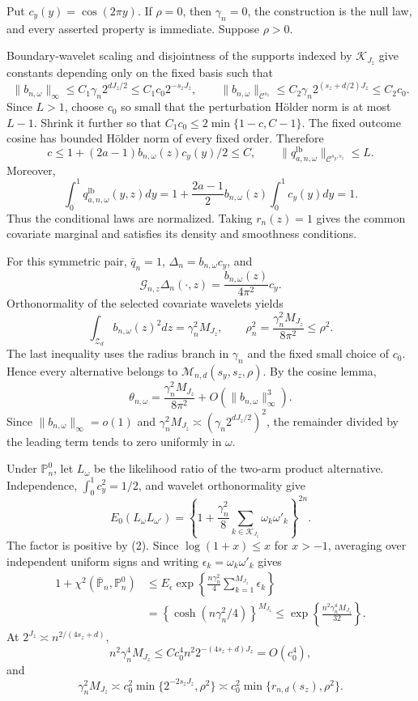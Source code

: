 Put \(c_y(y)=\cos(2\pi y)\). If \(\rho=0\), then \(\gamma_n=0\), the construction is the null law, and every asserted property is immediate. Suppose \(\rho>0\).

Boundary-wavelet scaling and disjointness of the supports indexed by \(\mathcal K_{J_z}\) give constants depending only on the fixed basis such that
\[
\|b_{n,\omega}\|_\infty
\le C_1\gamma_n2^{dJ_z/2}
\le C_1c_0 2^{-s_zJ_z},
\qquad
\|b_{n,\omega}\|_{\mathcal C^{s_z}}
\le C_2\gamma_n2^{(s_z+d/2)J_z}
\le C_2c_0.                                           \tag{1}
\]
Since \(L>1\), choose \(c_0\) so small that the perturbation H\"older norm is at most \(L-1\). Shrink it further so that \(C_1c_0\le2\min\{1-c,C-1\}\). The fixed outcome cosine has bounded H\"older norm of every fixed order. Therefore
\[
c\le 1+(2a-1)b_{n,\omega}(z)c_y(y)/2\le C,
\qquad
\|q_{a,n,\omega}^{\mathrm{lb}}\|_{\mathcal C^{s_y,s_z}}\le L. \tag{2}
\]
Moreover,
\[
\int_0^1q_{a,n,\omega}^{\mathrm{lb}}(y,z)dy
=1+\frac{2a-1}{2}b_{n,\omega}(z)\int_0^1c_y(y)dy=1.   \tag{3}
\]
Thus the conditional laws are normalized. Taking \(r_n(z)=1\) gives the common covariate marginal and satisfies its density and smoothness conditions.

For this symmetric pair, \(\bar q_n=1\), \(\Delta_n=b_{n,\omega}c_y\), and
\[
\mathcal G_{n,z}\Delta_n(\cdot,z)
=\frac{b_{n,\omega}(z)}{4\pi^2}c_y.
\]
Orthonormality of the selected covariate wavelets yields
\[
\int_{\mathcal Z_d}b_{n,\omega}(z)^2dz
=\gamma_n^2M_{J_z},\qquad
\rho_n^2=\frac{\gamma_n^2M_{J_z}}{8\pi^2}\le\rho^2.   \tag{4}
\]
The last inequality uses the radius branch in \(\gamma_n\) and the fixed small choice of \(c_0\). Hence every alternative belongs to \(\mathcal M_{n,d}(s_y,s_z,\rho)\). By the cosine lemma,
\[
\theta_{n,\omega}
=\frac{\gamma_n^2M_{J_z}}{8\pi^2}
+O(\|b_{n,\omega}\|_\infty^3).                        \tag{5}
\]
Since \(\|b_{n,\omega}\|_\infty=o(1)\) and \(\gamma_n^2M_{J_z}\asymp(\gamma_n2^{dJ_z/2})^2\), the remainder divided by the leading term tends to zero uniformly in \(\omega\).

Under \(\mathbb P_n^0\), let \(L_\omega\) be the likelihood ratio of the two-arm product alternative. Independence, \(\int_0^1c_y^2=1/2\), and wavelet orthonormality give
\[
E_0(L_\omega L_{\omega'})
=\left\{1+\frac{\gamma_n^2}{8}
\sum_{k\in\mathcal K_{J_z}}\omega_k\omega'_k\right\}^{2n}. \tag{6}
\]
The factor is positive by (2). Since \(\log(1+x)\le x\) for \(x>-1\), averaging over independent uniform signs and writing \(\epsilon_k=\omega_k\omega'_k\) gives
\[
\begin{split}
1+\chi^2(\overline{\mathbb P}_n,\mathbb P_n^0)
&\le E_\epsilon\exp\left\{\frac{n\gamma_n^2}{4}
\sum_{k=1}^{M_{J_z}}\epsilon_k\right\}\\
&=\left\{\cosh(n\gamma_n^2/4)\right\}^{M_{J_z}}
\le \exp\left\{\frac{n^2\gamma_n^4M_{J_z}}{32}\right\}.
\end{split}                                           \tag{7}
\]
At \(2^{J_z}\asymp n^{2/(4s_z+d)}\),
\[
n^2\gamma_n^4M_{J_z}
\le Cc_0^4n^2 2^{-(4s_z+d)J_z}=O(c_0^4),
\]
and
\[
\gamma_n^2M_{J_z}
\asymp c_0^2\min\{2^{-2s_zJ_z},\rho^2\}
\asymp c_0^2\min\{r_{n,d}(s_z),\rho^2\}.              \tag{8}
\]

